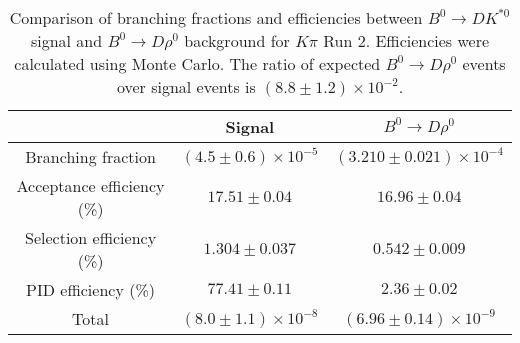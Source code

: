 \begin{table}
    \centering
    \begin{tabular}{ccc}
        \toprule
        & Signal & $B^0 \to D\rho^0$ \\
        \midrule
        Branching fraction & $(4.5 \pm 0.6) \times 10^{-5}$ & $(3.210 \pm 0.021) \times 10^{-4}$ \\
        Acceptance efficiency (\%) & $17.51 \pm 0.04$ & $16.96 \pm 0.04$ \\
        Selection efficiency (\%) & $1.304 \pm 0.037$ & $0.542 \pm 0.009$ \\
        PID efficiency (\%) & $77.41 \pm 0.11$ & $2.36 \pm 0.02$ \\
        \midrule
        Total & $(8.0 \pm 1.1) \times 10^{-8}$ & $(6.96 \pm 0.14) \times 10^{-9}$ \\
        \bottomrule
        \end{tabular}
        \caption{Comparison of branching fractions and efficiencies between $B^0 \to DK^{*0}$ signal and $B^0 \to D\rho^0$ background for $K\pi$ Run 2. Efficiencies were calculated using Monte Carlo. The ratio of expected $B^0 \to D\rho^0$ events over signal events is $(8.8 \pm 1.2) \times 10^{-2}$.}
\label{tab:rho_efficiency_Kpi_run2}
\end{table}
